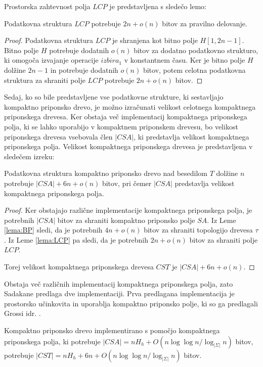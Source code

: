 Prostorska zahtevnost polja $LCP$ je predstavljena s sledečo lemo:

\begin{lema}\label{lema:LCP}
 Podatkovna struktura $LCP$ potrebuje $2n+o(n)$ bitov za pravilno delovanje.
\end{lema}

\begin{proof}
    Podatkovna struktura $LCP$ je shranjena kot bitno polje $H[1,2n-1]$. Bitno polje $H$ potrebuje dodatnih $o(n)$ bitov za dodatno podatkovno strukturo, ki omogoča izvajanje operacije $izbira_1$ v konstantnem času. Ker je bitno polje $H$ dolžine $2n-1$ in potrebuje dodatnih $o(n)$ bitov, potem celotna podatkovna struktura za shraniti polje $LCP$ potrebuje $2n+o(n)$ bitov.
\end{proof}

Sedaj, ko so bile predstavljene vse podatkovne strukture, ki sestavljajo kompaktno priponsko drevo, je možno izračunati velikost celotnega kompaktnega priponskega drevesa. Ker obstaja več implementacij kompaktnega priponskega polja, ki se lahko uporabijo v kompaktnem priponskem drevesu, bo velikost priponskega drevesa vsebovala člen $|CSA|$, ki predstavlja velikost kompaktnega priponskega polja. Velikost kompaktnega priponskega drevesa je predstavljena v sledečem izreku:

\begin{izr}
    Podatkovna struktura kompaktno priponsko drevo nad besedilom $T$ dolžine $n$ potrebuje $|CSA|+6n+o(n)$ bitov, pri čemer $|CSA|$ predstavlja velikost kompaktnega priponskega polja.
\end{izr}
\begin{proof}
    Ker obstajajo različne implementacije kompaktnega priponskega polja, je potrebnih $|CSA|$ bitov za shraniti kompaktno priponsko polje $SA$. Iz Leme \ref{lema:BP} sledi, da je potrebnih $4n+o(n)$ bitov za shraniti topologijo drevesa $\tau$. Iz Leme \ref{lema:LCP} pa sledi, da je potrebnih $2n+o(n)$ bitov za shraniti polje $LCP$.

    Torej velikost kompaktnega priponskega drevesa $CST$ je $|CSA|+6n+o(n)$.
\end{proof}

Obstaja več različnih implementacij kompaktnega priponskega polja, zato Sadakane \cite{Sadakane2007} predlaga dve implementaciji. Prva predlagana implementacija je prostorsko učinkovita in uporablja kompaktno priponsko polje, ki so ga predlagali Grossi idr. \cite{Grossi2003}. 

\begin{posl}\label{pos:CSAnh}
Kompaktno priponsko drevo implementirano s pomočjo kompaktnega priponskega polja, ki potrebuje $|CSA|=nH_h+O(n\log\log{n} / \log_{| \Sigma|}{n})$ bitov, potrebuje $|CST|= nH_h+6n+O(n\log\log{n} / \log_{| \Sigma|}{n})$ bitov.    
\end{posl}


